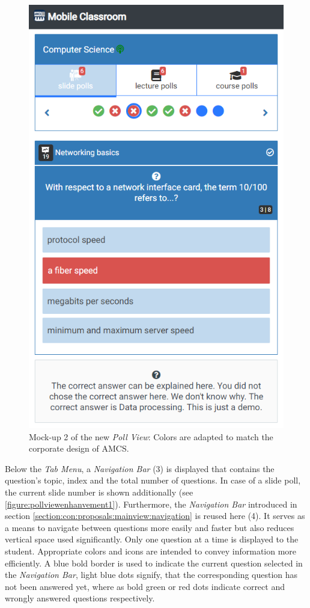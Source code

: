 \begin{figure}[ht]
	\begin{minipage}[t]{\textwidth}
		\centering
		\includegraphics[width=.7\textwidth]{mockups/poll_view_enhancement_v2.png}
		\captionsetup{width=.8\linewidth}
		\caption{Mock-up 2 of the new \emph{Poll View}:
			Colors are adapted to match the corporate design of AMCS.
		}
		\label{figure:pollviewenhanvement2}
	\end{minipage}
\end{figure}
Below the \emph{Tab Menu}, a \emph{Navigation Bar} (3) is displayed that contains the question's topic, index and the total number of questions. In case of a slide poll, the current slide number is shown additionally (see \autoref{figure:pollviewenhanvement1}).
Furthermore, the \emph{Navigation Bar} introduced in section \autoref{section:con:proposals:mainview:navigation} is reused here (4). It serves as a means to navigate between questions more easily and faster but also reduces vertical space used significantly. Only one question at a time is displayed to the student. Appropriate colors and icons are intended to convey information more efficiently. A blue bold border is used to indicate the current question selected in the \emph{Navigation Bar}, light blue dots signify, that the corresponding question has not been answered yet, where as bold green or red dots indicate correct and wrongly answered questions respectively. 
